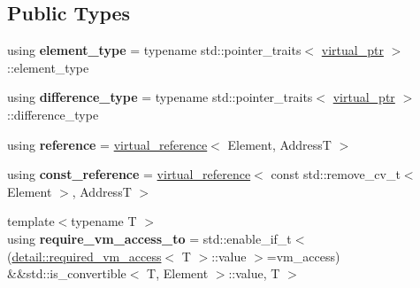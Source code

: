 \subsection*{Public Types}
\begin{DoxyCompactItemize}
\item 
\mbox{\label{classdistant_1_1memory_1_1virtual__ptr_ac3e54c3aeee6754a34e24e4a197e7f28}} 
using {\bfseries element\+\_\+type} = typename std\+::pointer\+\_\+traits$<$ \mbox{\hyperlink{classdistant_1_1memory_1_1virtual__ptr}{virtual\+\_\+ptr}} $>$\+::element\+\_\+type
\item 
\mbox{\label{classdistant_1_1memory_1_1virtual__ptr_a57c73631035f9adb29689dc8880f36fc}} 
using {\bfseries difference\+\_\+type} = typename std\+::pointer\+\_\+traits$<$ \mbox{\hyperlink{classdistant_1_1memory_1_1virtual__ptr}{virtual\+\_\+ptr}} $>$\+::difference\+\_\+type
\item 
\mbox{\label{classdistant_1_1memory_1_1virtual__ptr_a8cf58b4f960ddffac40c0e9d7a7de0c6}} 
using {\bfseries reference} = \mbox{\hyperlink{classdistant_1_1memory_1_1virtual__reference}{virtual\+\_\+reference}}$<$ Element, AddressT $>$
\item 
\mbox{\label{classdistant_1_1memory_1_1virtual__ptr_a5f6d081dc42a2a5ecb06eed60e16cb30}} 
using {\bfseries const\+\_\+reference} = \mbox{\hyperlink{classdistant_1_1memory_1_1virtual__reference}{virtual\+\_\+reference}}$<$ const std\+::remove\+\_\+cv\+\_\+t$<$ Element $>$, AddressT $>$
\item 
\mbox{\label{classdistant_1_1memory_1_1virtual__ptr_afb93921e8522362404fc705956c6a6ef}} 
{\footnotesize template$<$typename T $>$ }\\using {\bfseries require\+\_\+vm\+\_\+access\+\_\+to} = std\+::enable\+\_\+if\+\_\+t$<$(\mbox{\hyperlink{structdistant_1_1memory_1_1detail_1_1required__vm__access}{detail\+::required\+\_\+vm\+\_\+access}}$<$ T $>$\+::value $>$=vm\+\_\+access) \&\&std\+::is\+\_\+convertible$<$ T, Element $>$\+::value, T $>$
\end{DoxyCompactItemize}
